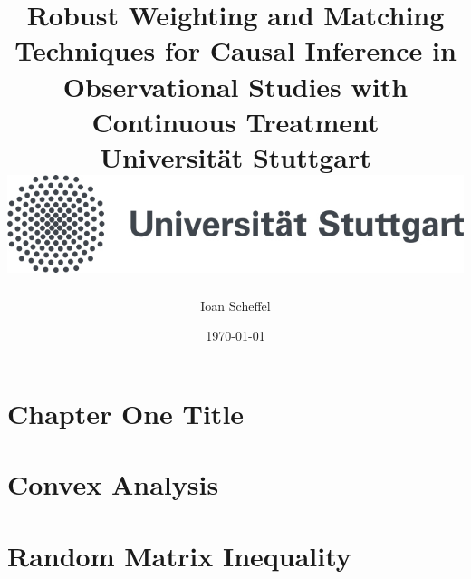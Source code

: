 \documentclass[12pt]{report}
\title{
{Robust Weighting and Matching Techniques for Causal Inference in Observational Studies with Continuous Treatment}\\
{\large Universität Stuttgart}\\
{\includegraphics{unistuttgart_logo_deutsch.jpg}}
}
\author{Ioan Scheffel}
\date{\today}
\begin{document}
\maketitle 

\tableofcontents 

\chapter{Chapter One Title}


\chapter{Convex Analysis}


\chapter{Random Matrix Inequality}

\end{document}
